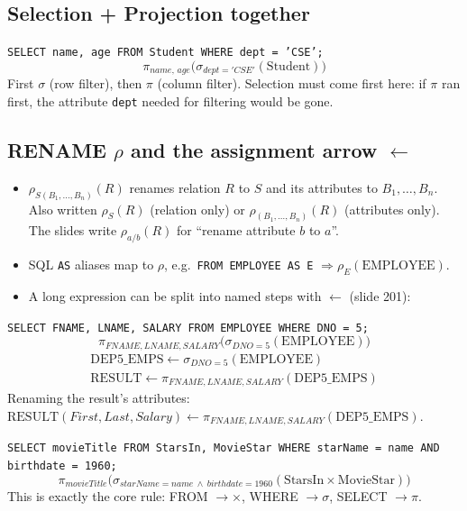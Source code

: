 \documentclass[10pt,a4paper]{article}
\newcommand{\R}[1]{\mathrm{#1}}          %
\begin{document}
\subsection{Selection + Projection together}
\begin{exbox}[Slide 198]
\texttt{SELECT name, age FROM Student WHERE dept = 'CSE';}
\[ \pi_{name,\,age}\big(\sigma_{dept='CSE'}(\R{Student})\big) \]
First $\sigma$ (row filter), then $\pi$ (column filter). Selection must come first here: if $\pi$ ran first, the attribute \texttt{dept} needed for filtering would be gone.
\end{exbox}

\subsection{RENAME $\rho$ and the assignment arrow $\leftarrow$}
\begin{itemize}
  \item $\rho_{S(B_1,\dots,B_n)}(R)$ renames relation $R$ to $S$ and its attributes to $B_1,\dots,B_n$. Also written $\rho_S(R)$ (relation only) or $\rho_{(B_1,\dots,B_n)}(R)$ (attributes only). The slides write $\rho_{a/b}(R)$ for ``rename attribute $b$ to $a$''.
  \item SQL \texttt{AS} aliases map to $\rho$, e.g.\ \texttt{FROM EMPLOYEE AS E} $\Rightarrow \rho_E(\R{EMPLOYEE})$.
  \item A long expression can be split into named steps with $\leftarrow$ (slide 201):
\end{itemize}
\begin{exbox}
\texttt{SELECT FNAME, LNAME, SALARY FROM EMPLOYEE WHERE DNO = 5;}
\[ \pi_{FNAME,LNAME,SALARY}\big(\sigma_{DNO=5}(\R{EMPLOYEE})\big) \]
\begin{gather*}
\R{DEP5\_EMPS} \leftarrow \sigma_{DNO=5}(\R{EMPLOYEE}) \\
\R{RESULT} \leftarrow \pi_{FNAME,LNAME,SALARY}(\R{DEP5\_EMPS})
\end{gather*}
Renaming the result's attributes: $\R{RESULT}(First, Last, Salary) \leftarrow \pi_{FNAME,LNAME,SALARY}(\R{DEP5\_EMPS})$.
\end{exbox}

\begin{exbox}
\texttt{SELECT movieTitle FROM StarsIn, MovieStar WHERE starName = name AND birthdate = 1960;}
\[ \pi_{movieTitle}\big(\sigma_{starName=name\ \wedge\ birthdate=1960}(\R{StarsIn} \times \R{MovieStar})\big) \]
This is exactly the core rule: FROM $\to\times$, WHERE $\to\sigma$, SELECT $\to\pi$.
\end{exbox}
\end{document}
